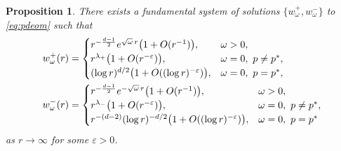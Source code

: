 \documentclass[12pt, a4paper, reqno]{amsart}
\numberwithin{equation}{section}
\newtheorem{proposition}[theorem]{Proposition}
\theoremstyle{definition}
\theoremstyle{remark}
\begin{document}
\begin{proposition} \label{prop:wasym}
There exists a fundamental system of solutions $\{w_{\omega}^+, w_{\omega}^-\}$ to \eqref{eq:pdeom} such that
\begin{align}
    w_{\omega}^+(r)
   &=\begin{cases}
    r^{-\frac{d-1}{2}}e^{\sqrt{\omega}\,r}\bigl(1+O(r^{-1})\bigr), & \omega>0,\\
    r^{\lambda_+}\bigl(1+O(r^{-\varepsilon})\bigr), & \omega=0,\ p\ne p^*,\\
    (\log r)^{d/2}\bigl(1+O((\log r)^{-\varepsilon})\bigr), & \omega=0,\ p=p^*,
    \end{cases}
    \notag\\
    w_{\omega}^-(r)
   &=\begin{cases}
    r^{-\frac{d-1}{2}}e^{-\sqrt{\omega}\,r}\bigl(1+O(r^{-1})\bigr), & \omega>0,\\
    r^{\lambda_-}\bigl(1+O(r^{-\varepsilon})\bigr), & \omega=0,\ p\ne p^*,\\
    r^{-(d-2)}(\log r)^{-d/2}\bigl(1+O((\log r)^{-\varepsilon})\bigr), & \omega=0,\ p=p^*
   \end{cases}
   \label{eq:wasym}
\end{align}
as $r\to\infty$ for some $\varepsilon>0$.
\end{proposition}
\end{document}
